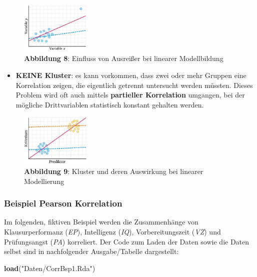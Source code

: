 \documentclass[
]{article}
\newenvironment{Shaded}{\begin{snugshade}}{\end{snugshade}}
\newcommand{\FunctionTok}[1]{\textcolor[rgb]{0.13,0.29,0.53}{\textbf{#1}}}
\newcommand{\NormalTok}[1]{#1}
\newcommand{\StringTok}[1]{\textcolor[rgb]{0.31,0.60,0.02}{#1}}
\providecommand{\tightlist}{%
  \setlength{\itemsep}{0pt}\setlength{\parskip}{0pt}}
\begin{document}
\begin{figure}
\centering
\includegraphics[width=0.3\textwidth,height=\textheight]{Images/Ausreisser.JPG}
\caption{\textbf{Abbildung 8}: Einfluss von Ausreißer bei linearer Modellbildung}
\end{figure}

\begin{itemize}
\tightlist
\item
  \textbf{KEINE Kluster}: es kann vorkommen, dass zwei oder mehr Gruppen eine Korrelation zeigen, die eigentlich getrennt untersucht werden müssten. Dieses Problem wird oft auch mittels \textbf{partieller Korrelation} umgangen, bei der mögliche Drittvariablen statistisch konstant gehalten werden.
\end{itemize}

\begin{figure}
\centering
\includegraphics[width=0.3\textwidth,height=\textheight]{Images/Cluster.JPG}
\caption{\textbf{Abbildung 9}: Kluster und deren Auswirkung bei linearer Modellierung}
\end{figure}

\subsubsection*{Beispiel Pearson Korrelation}\label{beispiel-pearson-korrelation}

Im folgenden, fiktiven Beispiel werden die Zusammenhänge von Klausurperformanz (\emph{EP}), Intelligenz (\emph{IQ}), Vorbereitungszeit (\emph{VZ}) und Prüfungsangst (\emph{PA}) korreliert. Der Code zum Laden der Daten sowie die Daten selbst sind in nachfolgender Ausgabe/Tabelle dargestellt:

\begin{Shaded}
\begin{Highlighting}[]
    \FunctionTok{load}\NormalTok{(}\StringTok{"Daten/CorrBsp1.Rda"}\NormalTok{)}
\end{Highlighting}
\end{Shaded}
\end{document}

